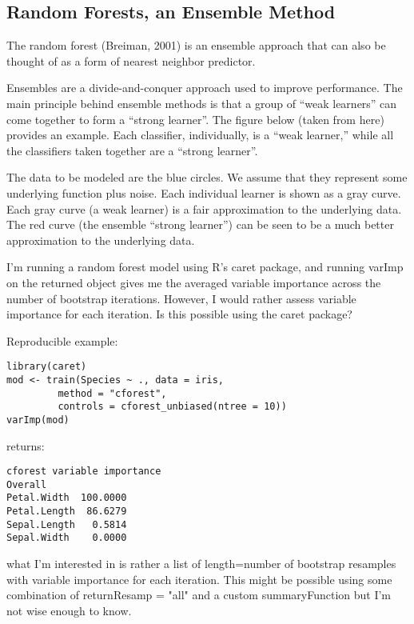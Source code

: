 \subsection{Random Forests, an Ensemble Method}

The random forest (Breiman, 2001) is an ensemble approach that can also be thought of as a form of nearest neighbor predictor.

Ensembles are a divide-and-conquer approach used to improve performance. The main principle behind ensemble methods is that a group of “weak learners” can come together to form a “strong learner”. The figure below (taken from here) provides an example. Each classifier, individually, is a “weak learner,” while all the classifiers taken together are a “strong learner”.

The data to be modeled are the blue circles. We assume that they represent some underlying function plus noise. Each individual learner is shown as a gray curve. Each gray curve (a weak learner) is a fair approximation to the underlying data. The red curve (the ensemble “strong learner”) can be seen to be a much better approximation to the underlying data.
\newpage

I'm running a random forest model using R's caret package, and running varImp on the returned object gives me the averaged variable importance across the number of bootstrap iterations. However, I would rather assess variable importance for each iteration. Is this possible using the caret package?

Reproducible example:
\begin{verbatim}
library(caret)
mod <- train(Species ~ ., data = iris,
         method = "cforest",
         controls = cforest_unbiased(ntree = 10))
varImp(mod)
\end{verbatim}
returns:
\begin{verbatim}
cforest variable importance
Overall
Petal.Width  100.0000
Petal.Length  86.6279
Sepal.Length   0.5814
Sepal.Width    0.0000 
\end{verbatim}
what I'm interested in is rather a list of length=number of bootstrap resamples with variable importance for each iteration. This might be possible using some combination of returnResamp = "all" and a custom summaryFunction but I'm not wise enough to know.



